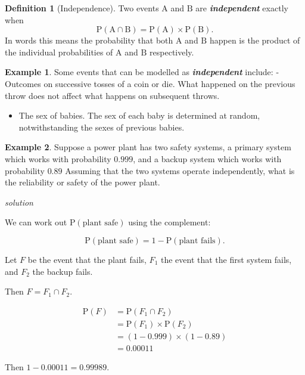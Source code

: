 \documentclass[
]{book}
\providecommand{\tightlist}{%
  \setlength{\itemsep}{0pt}\setlength{\parskip}{0pt}}
\theoremstyle{definition}
\newtheorem{definition}{Definition}[chapter]
\theoremstyle{definition}
\newtheorem{example}{Example}[chapter]
\theoremstyle{definition}
\theoremstyle{definition}
\theoremstyle{remark}
\begin{document}
\begin{definition}[Independence]
Two events \(\text{A}\) and \(\text{B}\) are \textbf{\emph{independent}} exactly when
\[\text{P}(\text{A}\cap\text{B}) = \text{P}(\text{A})\times \text{P}(\text{B}).\]
In words this means the probability that both \(\text{A}\) and \(\text{B}\) happen is the product of the individual probabilities of \(\text{A}\) and \(\text{B}\) respectively.
\end{definition}

\begin{example}

Some events that can be modelled as \textbf{\emph{independent}} include:
- Outcomes on successive tosses of a coin or die. What happened on the previous throw does not affect what happens on subsequent throws.

\begin{itemize}
\tightlist
\item
  The sex of babies. The sex of each baby is determined at random, notwithstanding the sexes of previous babies.
\end{itemize}

\end{example}

\begin{example}
Suppose a power plant has two safety systems, a primary system which works with probability \(0.999\), and a backup system which works with probability \(0.89\) Assuming that the two systems operate independently, what is the reliability or safety of the power plant.

\emph{solution}

We can work out \(\text{P}(\text{plant safe})\) using the complement:

\[\text{P}(\text{plant safe}) = 1-\text{P}(\text{plant fails}).\]

Let \(F\) be the event that the plant fails, \(F_1\) the event that the first system fails, and \(F_2\) the backup fails.

Then \(F = F_1 \cap F_2\).

\begin{align}
\text{P}(F) &= \text{P}(F_1 \cap F_2) \\
&= \text{P}(F_1) \times \text{P}(F_2) \\
&= (1-0.999)\times (1-0.89) \\
&= 0.00011
\end{align}

Then \(1-0.00011 = 0.99989\).
\end{example}
\end{document}
